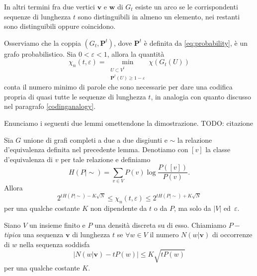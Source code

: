In altri termini fra due vertici \(\mathbf{v}\) e \(\mathbf{w}\) di \(G_t\) esiste un arco se le corrispondenti sequenze di lunghezza \(t\) sono distinguibili in almeno un elemento, nei restanti sono distinguibili oppure coincidono.

Osserviamo che la coppia \((G_t, \mathbf{P}^t)\), dove \(\mathbf{P}^t\) è definita da \eqref{eq:probability}, è un grafo probabilistico. Sia \(0<\varepsilon <1\), allora la quantità
\[\chi_{n}(t,\varepsilon) = \min_{\substack{U\subset V^{t}\\\mathbf{P}^t(U)\ge 1-\varepsilon}} \chi(G_{t}(U))\]
conta il numero minimo di parole che sono necessarie per dare una codifica propria di quasi tutte le sequenze di lunghezza \(t\), in analogia con quanto discusso nel paragrafo \ref{codinganalogy}.

Enunciamo i seguenti due lemmi omettendone la dimostrazione. TODO: citazione 
\begin{lemma}
	\label{boundslemma} Sia \(G\) unione di grafi completi a due a due disgiunti e \(\sim\) la relazione d'equivalenza definita nel precedente lemma. Denotiamo con \([v]\) la classe d'equivalenza di \(v\) per tale relazione e definiamo
	\[H(P\mid \sim)=\sum_{v\in V} P(v)\log{\frac{P([v])}{P(v)}}.\]
	Allora
	\[2^{tH(P\mid \sim)-K\sqrt{N}}\le \chi_{n}(t,\varepsilon)\le 2^{tH(P\mid \sim)+K\sqrt{N}}\]
	per una qualche costante \(K\) non dipendente da \(t\) o da \(P\), ma solo da \(|V|\) ed\ \(\varepsilon\). 
\end{lemma}
\begin{definition}
	Siano \(V\) un insieme finito e \(P\) una densità discreta su di esso. Chiamiamo \emph{\(P-\)tipica} una sequenza \(\mathbf{v}\) di lunghezza \(t\) se \(\forall w\in V\) il numero \(N(w\vert \mathbf{v})\) di occorrenze di \(w\) nella sequenza soddisfa
	\[\Big| N(w\vert\mathbf{v}) - tP(w)\Big|\le K\sqrt{tP(w)}\]
	per una qualche costante \(K\). 
\end{definition}


